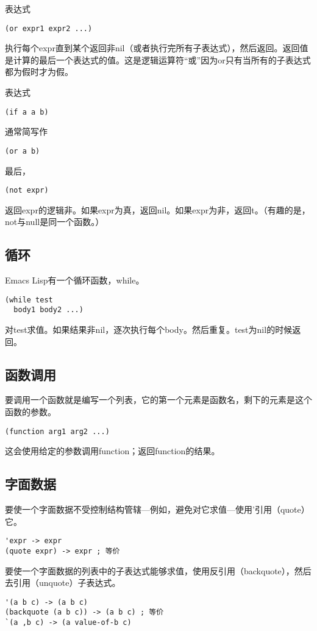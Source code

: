 表达式
\begin{verbatim}
(or expr1 expr2 ...)
\end{verbatim}
执行每个expr直到某个返回非nil（或者执行完所有子表达式），然后返回。返回值是计算的最后一个表达式的值。这是逻辑运算符“或”因为or只有当所有的子表达式都为假时才为假。

表达式
\begin{verbatim}
(if a a b)
\end{verbatim}
通常简写作
\begin{verbatim}
(or a b)
\end{verbatim}

最后，
\begin{verbatim}
(not expr)
\end{verbatim}
返回expr的逻辑非。如果expr为真，返回nil。如果expr为非，返回t。（有趣的是，not与null是同一个函数。）

\subsection{循环}
\label{section:B-Looping}

Emacs Lisp有一个循环函数，while。
\begin{verbatim}
(while test
  body1 body2 ...)
\end{verbatim}
对test求值。如果结果非nil，逐次执行每个body。然后重复。test为nil的时候返回。

\subsection{函数调用}
\label{section:B-Function-Call}

要调用一个函数就是编写一个列表，它的第一个元素是函数名，剩下的元素是这个函数的参数。
\begin{verbatim}
(function arg1 arg2 ...)
\end{verbatim}
这会使用给定的参数调用function；返回function的结果。

\subsection{字面数据}
\label{section:B-Literal-Data}

要使一个字面数据不受控制结构管辖---例如，避免对它求值---使用'引用（quote）它。
\begin{verbatim}
'expr -> expr
(quote expr) -> expr ; 等价
\end{verbatim}

要使一个字面数据的列表中的子表达式能够求值，使用反引用（backquote），然后去引用（unquote）子表达式。
\begin{verbatim}
'(a b c) -> (a b c)
(backquote (a b c)) -> (a b c) ; 等价
`(a ,b c) -> (a value-of-b c)
\end{verbatim}

